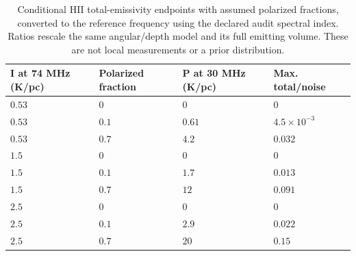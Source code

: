 \begin{table}[htbp]
\centering\small
\caption{Conditional HII total-emissivity endpoints with assumed polarized fractions, converted to the reference frequency using the declared audit spectral index. Ratios rescale the same angular/depth model and its full emitting volume. These are not local measurements or a prior distribution.}
\label{tab:emissivity}
\begin{tabular}{llll}
\toprule
I at 74 MHz (K/pc) & Polarized fraction & P at 30 MHz (K/pc) & Max. total/noise\\
\midrule
$0.53$ & $0$ & $0$ & $0$\\
$0.53$ & $0.1$ & $0.61$ & $4.5\times10^{-3}$\\
$0.53$ & $0.7$ & $4.2$ & $0.032$\\
$1.5$ & $0$ & $0$ & $0$\\
$1.5$ & $0.1$ & $1.7$ & $0.013$\\
$1.5$ & $0.7$ & $12$ & $0.091$\\
$2.5$ & $0$ & $0$ & $0$\\
$2.5$ & $0.1$ & $2.9$ & $0.022$\\
$2.5$ & $0.7$ & $20$ & $0.15$\\
\bottomrule
\end{tabular}
\end{table}
